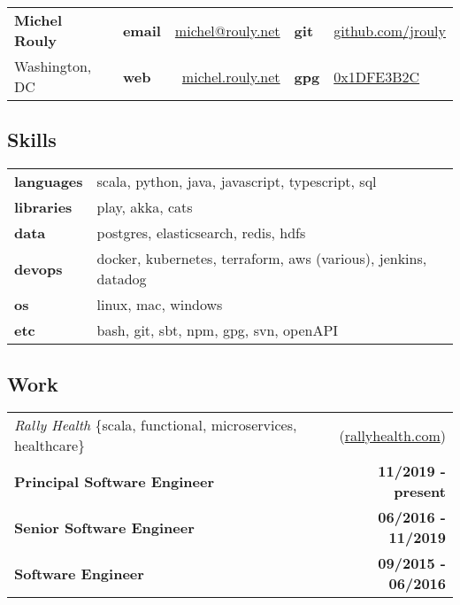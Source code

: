 \documentclass[10pt,letterpaper]{article}
\begin{document}
\setcounter{secnumdepth}{0}

\noindent
\begin{tabularx}{\textwidth}{@{} l X lr lX @{}}
  {\Large\textbf{Michel Rouly}} & &
      \textbf{email} & \href{mailto:michel@rouly.net}{michel@rouly.net} &
      \textbf{git} & \href{https://github.com/jrouly}{github.com/jrouly} \\
  {Washington, DC} & &
      \textbf{web} & \href{https://michel.rouly.net}{michel.rouly.net} &
      \textbf{gpg} & \href{http://keys.gnupg.net/pks/lookup?op=get\&search=0x68E925EE1DFE3B2C}{0x1DFE3B2C} \\
\end{tabularx}

\subsection{Skills}

\noindent
\begin{tabularx}{\textwidth}{@{} lX @{}}
  \textbf{languages} & scala, python, java, javascript, typescript, sql \\
  \textbf{libraries} & play, akka, cats \\
  \textbf{data} & postgres, elasticsearch, redis, hdfs \\
  \textbf{devops} & docker, kubernetes, terraform, aws (various), jenkins, datadog \\
  \textbf{os} & linux, mac, windows \\
  \textbf{etc} & bash, git, sbt, npm, gpg, svn, openAPI
\end{tabularx}

\subsection{Work}

\noindent\begin{tabularx}{\textwidth}{@{} Xr @{}}
  \textit{Rally Health} \{scala, functional, microservices, healthcare\} & (\href{https://www.rallyhealth.com}{rallyhealth.com}) \\
  \textbf{Principal Software Engineer} & \textbf{11/2019 - present} \\
  \textbf{Senior Software Engineer} & \textbf{06/2016 - 11/2019} \\
  \textbf{Software Engineer} & \textbf{09/2015 - 06/2016} \\
\end{tabularx}
\end{document}
